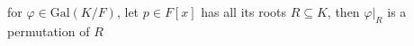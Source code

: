 \documentclass[preview]{standalone}
\begin{document}
\begin{center}
for $\varphi \in \text{Gal}(K/F)$, let $p \in F[x]$ has all its roots $R \subseteq K$, then $\varphi|_R$ is a permutation of $R$
\end{center}
\end{document}

